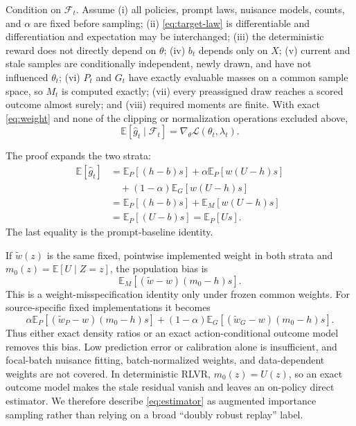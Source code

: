 \documentclass{article}
\begin{document}
\begin{theorem}
\label{thm:unbiased}
Condition on $\mathcal F_t$. Assume (i) all policies, prompt laws, nuisance
models, counts, and $\alpha$ are fixed before sampling; (ii)
\cref{eq:target-law} is differentiable and differentiation and expectation may
be interchanged; (iii) the deterministic reward does not directly depend on
$\theta$; (iv) $b_t$ depends only on $X$; (v) current and stale samples are
conditionally independent, newly drawn, and have not influenced $\theta_t$;
(vi) $P_t$ and $G_t$ have exactly evaluable masses on a common sample space, so
$M_t$ is computed exactly; (vii) every preassigned draw reaches a scored
outcome almost surely; and (viii) required moments are finite. With exact
\cref{eq:weight} and none of the clipping or normalization operations excluded
above,
\begin{equation}
\mathbb E[\widehat g_t\mid\mathcal F_t]
=\nabla_\theta\mathcal L(\theta_t,\lambda_t).
\end{equation}
\end{theorem}

The proof expands the two strata:
\begin{align}
\mathbb E[\widehat g_t]
&=\mathbb E_P[(h-b)s]
+\alpha\mathbb E_P[w(U-h)s]\nonumber\\
&\quad +(1-\alpha)\mathbb E_G[w(U-h)s]\\
&=\mathbb E_P[(h-b)s]+\mathbb E_M[w(U-h)s]\nonumber\\
&=\mathbb E_P[(U-b)s]=\mathbb E_P[Us].
\end{align}
The last equality is the prompt-baseline identity.

If $\widetilde w(z)$ is the same fixed, pointwise implemented weight in both
strata and
$m_0(z)=\mathbb E[U\mid Z=z]$, the population bias is
\begin{equation}
\mathbb E_M[(\widetilde w-w)(m_0-h)s].
\label{eq:bias}
\end{equation}
This is a weight-misspecification identity only under frozen common weights.
For source-specific fixed implementations it becomes
\begin{equation}
\alpha\mathbb E_P[(\widetilde w_P-w)(m_0-h)s]+
(1-\alpha)\mathbb E_G[(\widetilde w_G-w)(m_0-h)s].
\end{equation}
Thus either exact density ratios or an exact action-conditional outcome model
removes this bias. Low prediction error or calibration alone is insufficient,
and focal-batch nuisance fitting, batch-normalized weights, and data-dependent
weights are not covered. In
deterministic RLVR, $m_0(z)=U(z)$, so an exact outcome model makes the stale
residual vanish and leaves an on-policy direct estimator. We therefore
describe \cref{eq:estimator} as augmented importance sampling rather than
relying on a broad ``doubly robust replay'' label.
\end{document}
